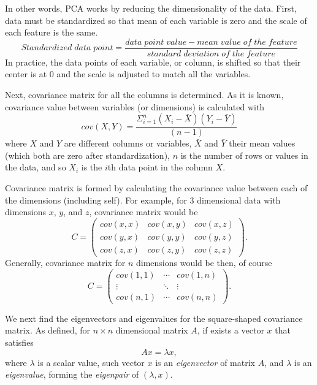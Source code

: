 In other words,
PCA works by reducing the dimensionality of the data.
First,
data must be standardized
so that mean of each variable is zero
and the scale of each feature is the same.
\begin{equation}
    Standardized\; data\; point = \frac{data\; point\; value - mean\; value\; of\; the\; feature}{standard\; deviation\; of\; the\; feature}
\end{equation}
In practice,
the data points of each variable, or column,
is shifted so that their center is at 0
and the scale is adjusted to match all the variables.

Next, covariance matrix for all the columns is determined.
As it is known,
covariance value between variables (or dimensions)
is calculated with
\begin{equation}
    cov(X,Y) = \frac{\Sigma_{i=1}^{n}(X_{i}-\bar{X})(Y_{i}-\bar{Y})}{(n-1)}
\end{equation}
where $X$ and $Y$ are different columns or variables,
$\bar{X}$ and $\bar{Y}$ their mean values (which both are zero after standardization),
$n$ is the number of rows or values in the data,
and so $X_{i}$ is the $i$th data point in the column $X$.~\cite{smith2002tutorial}

Covariance matrix is formed
by calculating the covariance value between each of the dimensions (including self).
For example,
for 3 dimensional data with dimensions $x$, $y$, and $z$,
covariance matrix would be
\begin{equation}
    C =
    \begin{pmatrix}
        cov(x,x) & cov(x,y) & cov(x,z) \\
        cov(y,x) & cov(y,y) & cov(y,z) \\
        cov(z,x) & cov(z,y) & cov(z,z)
    \end{pmatrix}.
\end{equation}
Generally,
covariance matrix for $n$ dimensions would be then, of course
\begin{equation}
    C =
    \begin{pmatrix}
        cov(1,1)    & \cdots    & cov(1,n)    \\
        \vdots      & \ddots    & \vdots        \\
        cov(n,1)    & \cdots    & cov(n,n)
    \end{pmatrix}.
\end{equation}

We next find the eigenvectors and eigenvalues
for the square-shaped covariance matrix.
As defined,
for $n\times n$ dimensional matrix $A$,
if exists a vector $x$ that satisfies
\begin{equation}
    Ax = \lambda x,
\end{equation}
where $\lambda$ is a scalar value,
such vector $x$ is an \textit{eigenvector} of matrix $A$,
and $\lambda$ is an \textit{eigenvalue},
forming the \textit{eigenpair} of $(\lambda,x)$.~\cite{borm2012numerical}

